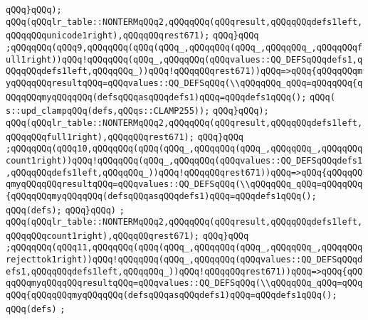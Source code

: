 \verb|qQQq}qQQq);|\newline
\verb|qQQq(qQQqlr_table::NONTERMqQQq2,qQQqqQQq(qQQqresult,qQQqqQQqdefs1left,qQQqqQQqunicode1right),qQQqqQQqrest671);|\newline
\verb|qQQq}qQQq|\newline
\verb|;qQQqqQQq(qQQq9,qQQqqQQq(qQQq(qQQq_,qQQqqQQq(qQQq_,qQQqqQQq_,qQQqqQQqfull1right))qQQq!qQQqqQQq(qQQq_,qQQqqQQq(qQQqvalues::QQ_DEFSqQQqdefs1,qQQqqQQqdefs1left,qQQqqQQq_))qQQq!qQQqqQQqrest671))qQQq=>qQQq{qQQqqQQqmyqQQqqQQqresultqQQq=qQQqvalues::QQ_DEFSqQQq(\\qQQqqQQq_qQQq=qQQqqQQq{qQQqqQQqmyqQQqqQQq(defsqQQqasqQQqdefs1)qQQq=qQQqdefs1qQQq();|\newline
\verb|qQQq(|\newline
\verb|s::upd_clampqQQq(defs,qQQqs::CLAMP255));|\newline
\verb|qQQq}qQQq);|\newline
\verb|qQQq(qQQqlr_table::NONTERMqQQq2,qQQqqQQq(qQQqresult,qQQqqQQqdefs1left,qQQqqQQqfull1right),qQQqqQQqrest671);|\newline
\verb|qQQq}qQQq|\newline
\verb|;qQQqqQQq(qQQq10,qQQqqQQq(qQQq(qQQq_,qQQqqQQq(qQQq_,qQQqqQQq_,qQQqqQQqcount1right))qQQq!qQQqqQQq(qQQq_,qQQqqQQq(qQQqvalues::QQ_DEFSqQQqdefs1,qQQqqQQqdefs1left,qQQqqQQq_))qQQq!qQQqqQQqrest671))qQQq=>qQQq{qQQqqQQqmyqQQqqQQqresultqQQq=qQQqvalues::QQ_DEFSqQQq(\\qQQqqQQq_qQQq=qQQqqQQq{qQQqqQQqmyqQQqqQQq(defsqQQqasqQQqdefs1)qQQq=qQQqdefs1qQQq();|\newline
\verb|qQQq(defs);|\newline
\verb|qQQq}qQQq)|\newline
\verb|;|\newline
\verb|qQQq(qQQqlr_table::NONTERMqQQq2,qQQqqQQq(qQQqresult,qQQqqQQqdefs1left,qQQqqQQqcount1right),qQQqqQQqrest671);|\newline
\verb|qQQq}qQQq|\newline
\verb|;qQQqqQQq(qQQq11,qQQqqQQq(qQQq(qQQq_,qQQqqQQq(qQQq_,qQQqqQQq_,qQQqqQQqrejecttok1right))qQQq!qQQqqQQq(qQQq_,qQQqqQQq(qQQqvalues::QQ_DEFSqQQqdefs1,qQQqqQQqdefs1left,qQQqqQQq_))qQQq!qQQqqQQqrest671))qQQq=>qQQq{qQQqqQQqmyqQQqqQQqresultqQQq=qQQqvalues::QQ_DEFSqQQq(\\qQQqqQQq_qQQq=qQQqqQQq{qQQqqQQqmyqQQqqQQq(defsqQQqasqQQqdefs1)qQQq=qQQqdefs1qQQq();|\newline
\verb|qQQq(defs)|\newline
\verb|;|\newline

